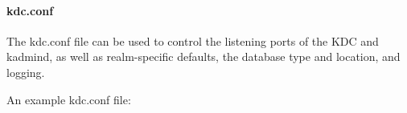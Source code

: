 \documentclass[letterpaper,10pt,english]{sphinxmanual}
\begin{document}
%
\begin{sphinxVerbatim}[commandchars=\\\{\}]
\PYG{p}{[}\PYG{p}{]}
      

\PYG{p}{[}\PYG{p}{]}
      
          
          
          
\end{sphinxVerbatim}


\paragraph{kdc.conf}
\label{\detokenize{admin/install_kdc:kdc-conf}}
The kdc.conf file can be used to control the listening ports of the
KDC and kadmind, as well as realm-specific defaults, the database type
and location, and logging.

An example kdc.conf file:
\end{document}

